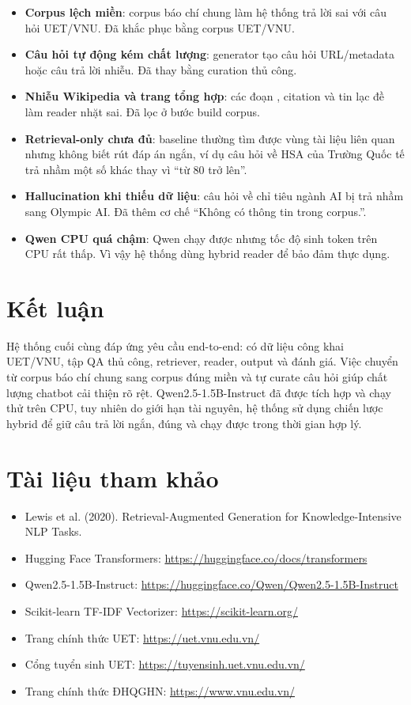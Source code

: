 \documentclass[12pt,a4paper]{article}
\newcommand{\code}[1]{\path{#1}}
\begin{document}
\begin{itemize}
  \item \textbf{Corpus lệch miền}: corpus báo chí chung làm hệ thống trả lời sai với câu hỏi UET/VNU. Đã khắc phục bằng corpus UET/VNU.
  \item \textbf{Câu hỏi tự động kém chất lượng}: generator tạo câu hỏi URL/metadata hoặc câu trả lời nhiễu. Đã thay bằng curation thủ công.
  \item \textbf{Nhiễu Wikipedia và trang tổng hợp}: các đoạn \code{\{\{...\}\}}, citation và tin lạc đề làm reader nhặt sai. Đã lọc ở bước build corpus.
  \item \textbf{Retrieval-only chưa đủ}: baseline thường tìm được vùng tài liệu liên quan nhưng không biết rút đáp án ngắn, ví dụ câu hỏi về HSA của Trường Quốc tế trả nhầm một số khác thay vì ``từ 80 trở lên''.
  \item \textbf{Hallucination khi thiếu dữ liệu}: câu hỏi về chỉ tiêu ngành AI bị trả nhầm sang Olympic AI. Đã thêm cơ chế ``Không có thông tin trong corpus.''.
  \item \textbf{Qwen CPU quá chậm}: Qwen chạy được nhưng tốc độ sinh token trên CPU rất thấp. Vì vậy hệ thống dùng hybrid reader để bảo đảm thực dụng.
\end{itemize}

\section{Kết luận}

Hệ thống cuối cùng đáp ứng yêu cầu end-to-end: có dữ liệu công khai UET/VNU, tập QA thủ công, retriever, reader, output và đánh giá. Việc chuyển từ corpus báo chí chung sang corpus đúng miền và tự curate câu hỏi giúp chất lượng chatbot cải thiện rõ rệt. Qwen2.5-1.5B-Instruct đã được tích hợp và chạy thử trên CPU, tuy nhiên do giới hạn tài nguyên, hệ thống sử dụng chiến lược hybrid để giữ câu trả lời ngắn, đúng và chạy được trong thời gian hợp lý.

\section*{Tài liệu tham khảo}

\begin{itemize}
  \item Lewis et al. (2020). Retrieval-Augmented Generation for Knowledge-Intensive NLP Tasks.
  \item Hugging Face Transformers: \url{https://huggingface.co/docs/transformers}
  \item Qwen2.5-1.5B-Instruct: \url{https://huggingface.co/Qwen/Qwen2.5-1.5B-Instruct}
  \item Scikit-learn TF-IDF Vectorizer: \url{https://scikit-learn.org/}
  \item Trang chính thức UET: \url{https://uet.vnu.edu.vn/}
  \item Cổng tuyển sinh UET: \url{https://tuyensinh.uet.vnu.edu.vn/}
  \item Trang chính thức ĐHQGHN: \url{https://www.vnu.edu.vn/}
\end{itemize}
\end{document}
